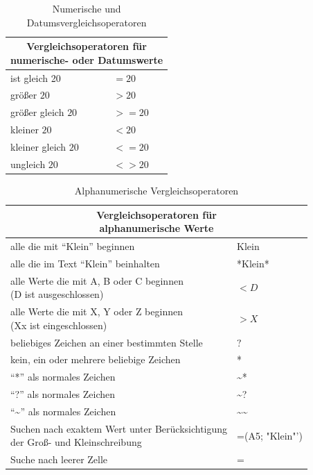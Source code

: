 \FloatBarrier
\begin{table}[H]
	\centering
		\begin{tabular}{@{}p{4cm}p{2cm}@{}}
			\toprule \multicolumn{2}{c}{ \parbox[t]{6cm}{\centering \textbf{Vergleichsoperatoren für \\numerische- oder Datumswerte}}}\\
			\midrule ist gleich 20 &  $=20$\\
			größer $20$ & $>20$  \\
			größer gleich $20$ & $>=20$  \\
			kleiner $20$ & $<20$  \\
			kleiner gleich $20$ & $<=20$  \\
			ungleich $20$ & $<>20$\\
		\end{tabular}
	\caption{Numerische und Datumsvergleichsoperatoren}
\end{table}
\vspace{-1em}
\FloatBarrier
\begin{table}[H]
	\centering
		\begin{tabular}{@{}p{9cm}p{6cm}@{}}
			\toprule \multicolumn{2}{c}{ \parbox[t]{9cm}{\centering \textbf{Vergleichsoperatoren für \\alphanumerische Werte}}}\\
			\midrule alle die mit "`Klein"' beginnen &  Klein\\
			alle die im Text "`Klein"' beinhalten & *Klein* \\
			 \parbox[t]{8cm}{alle Werte die mit A, B oder C beginnen\\ (D ist ausgeschlossen)}  & $<D$ \\
			 \parbox[t]{8cm}{alle Werte die mit X, Y oder Z beginnen\\ (Xx ist eingeschlossen)}  & $>X$ \\
			 beliebiges Zeichen an einer bestimmten Stelle & $?$ \\
			 kein, ein oder mehrere beliebige Zeichen & * \\
			 "`*"' als normales Zeichen & \~{}* \\
			 "`?"' als normales Zeichen & \~{}? \\
			 "`\~{}"' als normales Zeichen & \~{}\~{} \\
			 \parbox[t]{9cm}{Suchen nach exaktem Wert unter Berücksichtigung\\\quad der Groß- und Kleinschreibung} & =(A5; "Klein"') \\
			 Suche nach leerer Zelle &  =\upquote{}\\
		\end{tabular}
	\caption{Alphanumerische Vergleichsoperatoren}
\end{table}
\FloatBarrier

